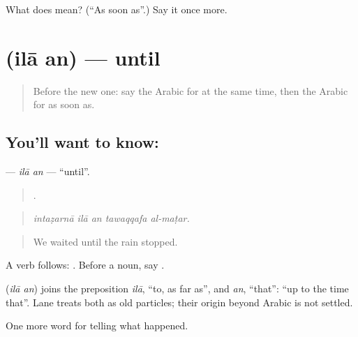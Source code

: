 \begin{tcolorbox}[breakable,colback=teal!4,colframe=teal!35!black,title={Before you move on}]
What does  mean? (\textquotedblleft{}As soon as\textquotedblright{}.) Say it once more.
\end{tcolorbox}
\section[\texorpdfstring{\ar{إلى} \ar{أن} (ilā an)}{إلى أن (ilā an)}]{  (ilā an) — until}

\label{lesson:AR-C327-ila-an}



\begin{quote}
Before the new one: say the Arabic for at the same time, then the Arabic for as soon as.
\end{quote}

\subsection*{You'll want to know:  }
\textbf{ } — \emph{ilā an} — \textquotedblleft{}until\textquotedblright{}.

\begin{quote}
    .
\end{quote}

\begin{quote}
\emph{intaẓarnā ilā an tawaqqafa al-maṭar.}
\end{quote}

\begin{quote}
We waited until the rain stopped.
\end{quote}

A verb follows:   . Before a noun, say .

\begin{cousinweb}
\textbf{ } (\emph{ilā an}) joins the preposition \emph{ilā}, \textquotedblleft{}to, as far as\textquotedblright{}, and \emph{an}, \textquotedblleft{}that\textquotedblright{}: \textquotedblleft{}up to the time that\textquotedblright{}. Lane treats both as old particles; their origin beyond Arabic is not settled.
\end{cousinweb}

\begin{grammarlens}[title={What you've built}]
One more word for telling what happened.
\end{grammarlens}

